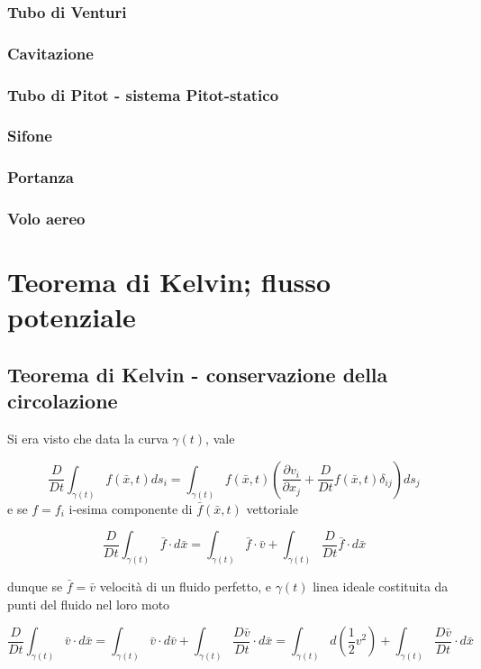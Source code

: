 \documentclass[a4paper,11pt]{report}
\newcommand{\x}{\bar{x}}
\newcommand{\vel}{\bar{v}}
\begin{document}
		\subsection{Tubo di Venturi}
		\subsection{Cavitazione}
		\subsection{Tubo di Pitot - sistema Pitot-statico}
		\subsection{Sifone}
		\subsection{Portanza}
		\subsection{Volo aereo}
				
\chapter{Teorema di Kelvin; flusso potenziale}
	\section{Teorema di Kelvin - conservazione della circolazione}
	
	Si era visto che data la curva $\gamma(t)$, vale
	
	$$
		\dfrac{D}{Dt}\int_{\gamma(t)} f(\x,t)ds_i = \int_{\gamma(t)} f(\x,t)\left(\dfrac{\partial v_i}{\partial x_j} + \dfrac{D}{Dt}f(\x,t)\delta_{ij}\right)ds_j
	$$
	e se $f=f_i$ i-esima componente di $\bar{f}(\x,t)$ vettoriale
	
	$$
	\dfrac{D}{Dt} \int_{\gamma(t)}\bar{f}\cdot d\x = \int_{\gamma(t)}\bar{f}\cdot \vel + \int_{\gamma(t)}\dfrac{D}{Dt}\bar{f}\cdot d\x
	$$
	
	dunque se $\bar{f}=\vel$ velocità di un fluido perfetto, e $\gamma(t)$ linea ideale costituita da punti del fluido nel loro moto
	
	$$
	\dfrac{D}{Dt}\int_{\gamma(t)}\vel\cdot d\x = 
	\int_{\gamma(t)}\vel\cdot d\vel + \int_{\gamma(t)}\dfrac{D\vel}{Dt}\cdot d\x = 
	\int_{\gamma(t)} d\left(\dfrac{1}{2}v^2\right) + \int_{\gamma(t)} \dfrac{D\vel}{Dt}\cdot d\x
	$$
	
\end{document}
